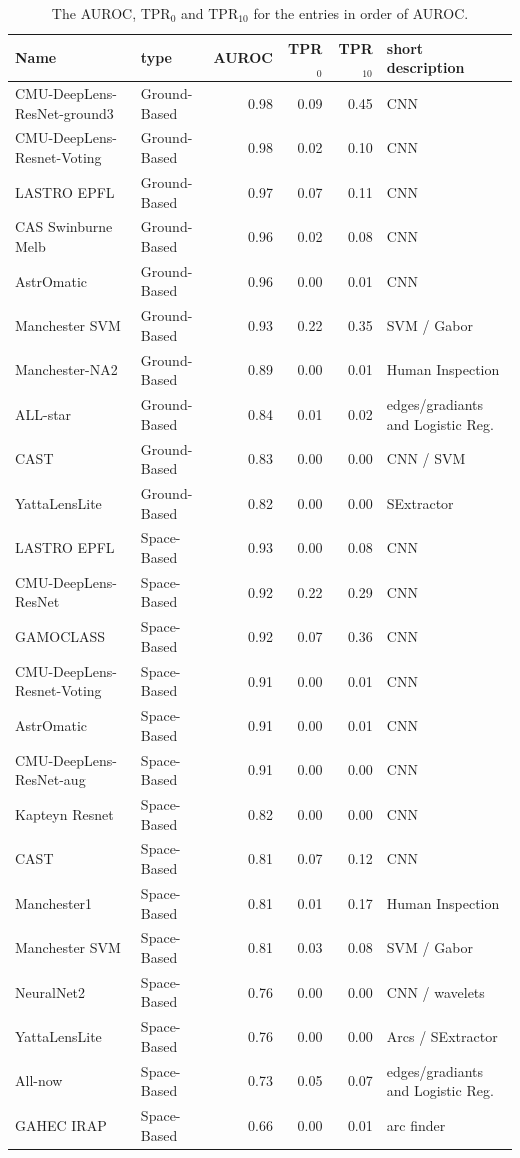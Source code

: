 \documentclass[useAMS,usenatbib]{mnras}
\begin{document}
\begin{table}
\centering
\begin{tabular}{llrrrl}
  \hline
  Name & type & AUROC & TPR$_0$ & TPR$_{10}$ & short description \\ 
  \hline
 CMU-DeepLens-ResNet-ground3 & Ground-Based & 0.98 & 0.09 & 0.45 & CNN \\ 
  CMU-DeepLens-Resnet-Voting & Ground-Based & 0.98 & 0.02 & 0.10 & CNN \\ 
  LASTRO EPFL & Ground-Based & 0.97 & 0.07 & 0.11 & CNN \\ 
  CAS Swinburne Melb & Ground-Based & 0.96 & 0.02 & 0.08 & CNN \\ 
  AstrOmatic & Ground-Based & 0.96 & 0.00 & 0.01 & CNN \\ 
  Manchester SVM & Ground-Based & 0.93 & 0.22 & 0.35 & SVM / Gabor \\ 
  Manchester-NA2 & Ground-Based & 0.89 & 0.00 & 0.01 & Human Inspection \\ 
   ALL-star & Ground-Based & 0.84 & 0.01 & 0.02 & edges/gradiants and Logistic Reg. \\ 
   CAST & Ground-Based & 0.83 & 0.00 & 0.00 & CNN / SVM \\ 
   YattaLensLite & Ground-Based & 0.82 & 0.00 & 0.00 & SExtractor \\ 
   LASTRO EPFL & Space-Based & 0.93 & 0.00 & 0.08 & CNN \\ 
  CMU-DeepLens-ResNet & Space-Based & 0.92 & 0.22 & 0.29 & CNN \\ 
   GAMOCLASS & Space-Based & 0.92 & 0.07 & 0.36 & CNN \\ 
  CMU-DeepLens-Resnet-Voting & Space-Based & 0.91 & 0.00 & 0.01 & CNN \\ 
  AstrOmatic & Space-Based & 0.91 & 0.00 & 0.01 & CNN \\ 
   CMU-DeepLens-ResNet-aug & Space-Based & 0.91 & 0.00 & 0.00 & CNN \\ 
   Kapteyn Resnet & Space-Based & 0.82 & 0.00 & 0.00 & CNN \\ 
   CAST & Space-Based & 0.81 & 0.07 & 0.12 & CNN \\ 
  Manchester1 & Space-Based & 0.81 & 0.01 & 0.17 & Human Inspection \\ 
   Manchester SVM & Space-Based & 0.81 & 0.03 & 0.08 & SVM / Gabor \\ 
   NeuralNet2 & Space-Based & 0.76 & 0.00 & 0.00 & CNN / wavelets \\ 
   YattaLensLite & Space-Based & 0.76 & 0.00 & 0.00 & Arcs / SExtractor \\ 
   All-now & Space-Based & 0.73 & 0.05 & 0.07 & edges/gradiants and Logistic Reg. \\ 
  GAHEC IRAP & Space-Based & 0.66 & 0.00 & 0.01 & arc finder \\ 
   \hline
\end{tabular}
\caption{The AUROC, TPR$_0$ and TPR$_{10}$ for the entries in order of AUROC.}
\label{table:AUROC}
\end{table}
\end{document}
